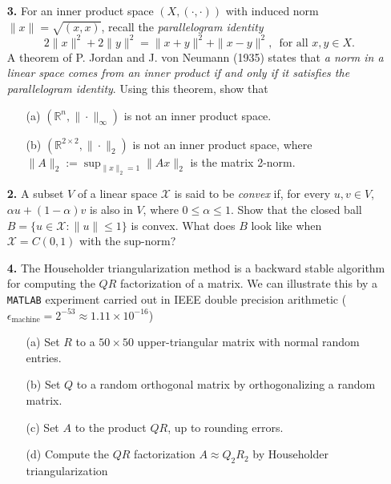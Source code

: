 \documentclass[10pt]{report}
\begin{document}
\begin{enumerate}
\item[\textbf{3.}] For an inner product space $(X, (\cdot, \cdot))$ with induced norm $\|x\|= \sqrt{(x, x)}$, recall  the \textit{parallelogram identity}
\[2 \|x\|^2 + 2\|y\|^2 = \|x+y\|^2 + \|x-y\|^2, \, \text{ for all } x,y \in X.\]
A theorem of P. Jordan and J. von Neumann (1935) states that \textit{a norm in a linear space comes from an inner product if and only if it satisfies the parallelogram identity}. Using this theorem, show that

\begin{enumerate}
  \item[(a)] $(\mathbb{R}^n, \| \cdot \|_\infty)$ is not an inner product space.
  \item[(b)] $(\mathbb{R}^{2 \times 2}, \| \cdot \|_2)$ is not an inner product space, where $\|A\|_2:= \sup_{\|x\|_2=1} \|Ax\|_2$ is the matrix 2-norm.

\end{enumerate}


\vspace{0.7cm}
\item[\textbf{2.}] A subset $V$ of a linear space $\mathcal{X}$ is
 said to be \textit{convex} if, for every $u,v\in V$, $\alpha u+(1-
 \alpha)v$ is also in $V$, where $0\leq\alpha\leq1$. Show that the
 closed ball $B=\{u\in\mathcal{X}:\|u\|\leq1\}$ is convex. What does $B$ look
 like when $\mathcal{X}=C(0,1)$ with the sup-norm?\\
\begin{center}
\end{center}










\vspace{0.7cm}

\item[\textbf{4.}] The Householder triangularization method is a backward stable algorithm
  for computing the $QR$ factorization of a matrix. We can illustrate this by a \verb+MATLAB+
  experiment carried out in IEEE double precision arithmetic
  ($\epsilon_{\text{machine}}=2^{-53}\approx 1.11\times10^{-16}$)

  \begin{enumerate}
    \item[(a)] Set $R$ to a $50\times50$ upper-triangular matrix with normal
    random entries.
    \item[(b)] Set $Q$ to a random orthogonal matrix by orthogonalizing a random
    matrix.
    \item[(c)] Set $A$ to the product $QR$, up to rounding errors.
    \item[(d)] Compute the $QR$ factorization $A\approx Q_2R_2$ by Householder
    triangularization 
  \end{enumerate}


\end{enumerate}
\end{document}

